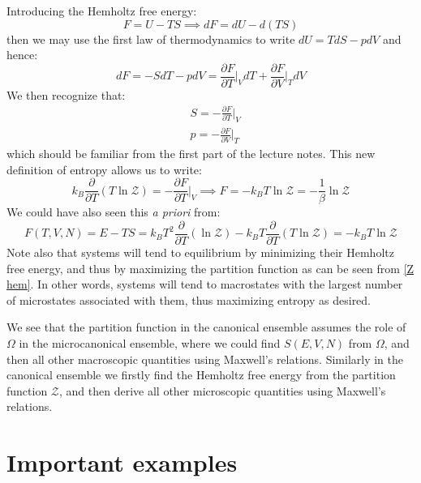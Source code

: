 \documentclass[a4paper,11pt,oneside]{book}
\begin{document}
Introducing the Hemholtz free energy:
\begin{equation}
    F= U-TS \implies dF = dU - d(TS)
\end{equation}
then we may use the first law of thermodynamics to write $dU = TdS- pdV$ and hence:
\begin{equation}
    dF = -S dT - pdV = \frac{\partial F}{\partial T}\bigg|_V dT + \frac{\partial F}{\partial V}\bigg|_T dV
\end{equation}
We then recognize that:
\begin{align}
    &S =  -\frac{\partial F}{\partial T}\bigg|_V \\
    &p = -\frac{\partial F}{\partial V}\bigg|_T
\end{align}
which should be familiar from the first part of the lecture notes. This new definition of entropy allows us to write:
\begin{equation}\label{Z hem}
    k_B \frac{\partial}{\partial T}(T \ln \mathcal{Z}) = -\frac{\partial F}{\partial T}\bigg|_V \implies \boxed{F =-k_B T \ln \mathcal{Z} = -\frac{1}{\beta} \ln \mathcal{Z}} 
\end{equation}
We could have also seen this \textit{ a priori} from:
\begin{equation}
    F(T,V,N) = E-TS=k_B T^2 \frac{\partial}{\partial T}(\ln \mathcal{Z}) - k_B T \frac{\partial}{\partial T} (T \ln \mathcal{Z}) = -k_B T \ln \mathcal{Z}
\end{equation}
Note also that systems will tend to equilibrium by minimizing their Hemholtz free energy, and thus by maximizing the partition function as can be seen from \eqref{Z hem}. In other words, systems will tend to macrostates with the largest number of microstates associated with them, thus maximizing entropy as desired. 


We see that the partition function in the canonical ensemble assumes the role of $\Omega$ in the microcanonical ensemble, where we could find $S(E,V,N)$ from $\Omega$, and then all other macroscopic quantities using Maxwell's relations. Similarly in the canonical ensemble we firstly find the Hemholtz free energy from the partition function $\mathcal{Z}$, and then derive all other microscopic quantities using Maxwell's relations.
\section{Important examples}
\end{document}
